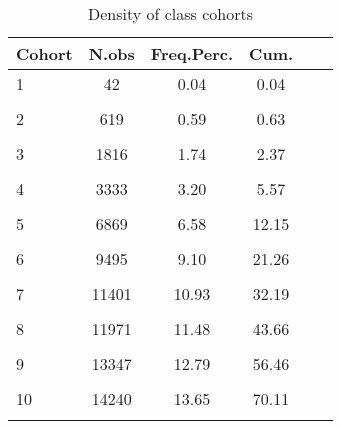 
\begin{table}\centering
    \def\sym#1{\ifmmode^{#1}\else\(^{#1}\)\fi}
    \caption{Density of class cohorts \label{desc-cohort}}
    
    \begin{tabular}{l*{5}{c}}
    
    \hline
                \multicolumn{1}{c}{Cohort} & \multicolumn{1}{c}{N.obs} &  \multicolumn{1}{c}{Freq.Perc.} & \multicolumn{1}{c}{Cum.}\\
    \hline
    1           &          42         & 0.04      &  0.04\\
                &                     \\
    
    2           &         619    &0.59     &   0.63       \\
                &                     \\
    
    3           &        1816    & 1.74     &   2.37    \\
                &                     \\
    
    4           &        3333   & 3.20   &     5.57     \\
                &                     \\
    
    5           &        6869    &6.58     &  12.15     \\
                &                     \\
    
    6           &        9495    &9.10   &    21.26     \\
                &                     \\
    
    7           &       11401     &10.93   &    32.19    \\
                &                     \\
    
    8           &       11971    &11.48      & 43.66     \\
                &                     \\
    
    9           &       13347    &12.79     &  56.46     \\
                &                     \\
    
    10          &       14240    & 13.65  &     70.11    \\
                &                     \\
    

\end{tabular}
\end{table}
